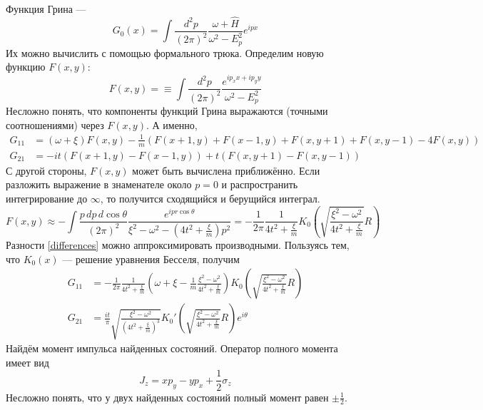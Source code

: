 \documentclass{article}
\begin{document}
Функция Грина --- 
\begin{equation}
    G_0(x) = \int \frac{d^2 p}{(2\pi)^2} 
            \frac{\omega + \hat{H}}{\omega^2 - E_p^2} e^{ipx}
\end{equation}
Их можно вычислить с помощью формального трюка. Определим новую функцию
$F(x,y)$:
\begin{equation}
    F(x,y) = \equiv \int \frac{d^2 p}{(2\pi)^2} 
            \frac{e^{ip_x x + ip_y y}}{\omega^2 - E_p^2} 
\end{equation}
Несложно понять, что компоненты функций Грина выражаются (точными соотношениями)
 через $F(x,y)$. А именно,
\begin{equation}
    \label{differences}
    \begin{split}
        G_{11} & = (\omega + \xi) F(x,y) - 
            \frac{1}{m}(F(x+1,y) + F(x-1,y) + F(x,y+1) + F(x, y-1) - 4F(x,y))\\
        G_{21} & = -it(F(x+1,y) - F(x-1,y)) + t(F(x,y+1) - F(x,y-1))
    \end{split}
\end{equation}
С другой стороны, $F(x,y)$ может быть вычислена приближённо. Если разложить 
выражение в знаменателе около $p = 0$ и распространить интегрирование до $\infty$, то получится
сходящийся и берущийся интеграл.
\begin{equation}
    F(x,y) \approx -\int \frac{p\,dp\,d\cos{\theta}}{(2\pi)^2} 
        \frac{e^{ipr\cos{\theta}}}{\xi^2 - \omega^2 - (4t^2 + \frac{\xi}{m})p^2} = 
        -\frac{1}{2\pi} \frac{1}{4t^2 + \frac{\xi}{m}}
        K_0 \left(\sqrt{\frac{\xi^2 - \omega^2}{4t^2 + \frac{\xi}{m}}}R \right)
\end{equation}
Разности \eqref{differences} можно аппроксимировать производными. Пользуясь тем, что
$K_0(x)$ --- решение уравнения Бесселя, получим 
\begin{equation}
    \begin{split}
        G_{11} & = -\frac{1}{2\pi} \frac{1}{4t^2 + \frac{\xi}{m}}
        \left( \omega + \xi - \frac{1}{m} \frac{\xi^2 - \omega^2}{4t^2 + \frac{\xi}{m}} \right)
        K_0 \left(\sqrt{\frac{\xi^2 - \omega^2}{4t^2 + \frac{\xi}{m}}}R \right)\\
        G_{21} & = \frac{it}{\pi} \sqrt{\frac{\xi^2 - \omega^2}
                                     {(4t^2 + \frac{\xi}{m})^{3}}}
        K_0' \left(\sqrt{\frac{\xi^2 - \omega^2}{4t^2 + \frac{\xi}{m}}}R \right)e^{i\theta}
    \end{split}
\end{equation}
Найдём момент импульса найденных состояний. Оператор полного момента имеет вид
\begin{equation}
    J_z = x p_y - y p_x + \frac{1}{2}\sigma_z
\end{equation}
Несложно понять, что у двух найденных состояний полный момент равен $\pm \frac{1}{2}$.
\end{document}
